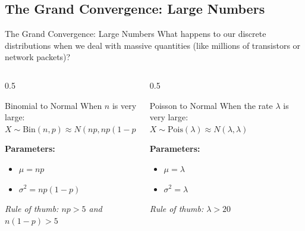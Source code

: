 \subsection{The Grand Convergence: Large Numbers}
\begin{frame}{The Grand Convergence: Large Numbers}
    What happens to our discrete distributions when we deal with massive quantities (like millions of transistors or network packets)? 


    \vspace{0.2cm}
    \begin{columns}[T]
        \begin{column}{0.5\textwidth}
            \begin{block}{Binomial to Normal}
                When $n$ is very large:\\
                $X \sim \text{Bin}(n, p) \approx N(np, np(1-p))$
                
                \vspace{0.1cm}
                \textbf{Parameters:}
                \begin{itemize}
                    \item $\mu = np$
                    \item $\sigma^2 = np(1-p)$
                \end{itemize}
                \vspace{0.1cm}
                \textit{Rule of thumb: $np > 5$ and $n(1-p) > 5$}
            \end{block}
        \end{column}
        
        \begin{column}{0.5\textwidth}
            \begin{block}{Poisson to Normal}
                When the rate $\lambda$ is very large:\\
                $X \sim \text{Pois}(\lambda) \approx N(\lambda, \lambda)$
                
                \vspace{0.1cm}
                \textbf{Parameters:}
                \begin{itemize}
                    \item $\mu = \lambda$
                    \item $\sigma^2 = \lambda$
                \end{itemize}
                \vspace{0.1cm}
                \textit{Rule of thumb: $\lambda > 20$}
            \end{block}
        \end{column}
    \end{columns}


\end{frame}
